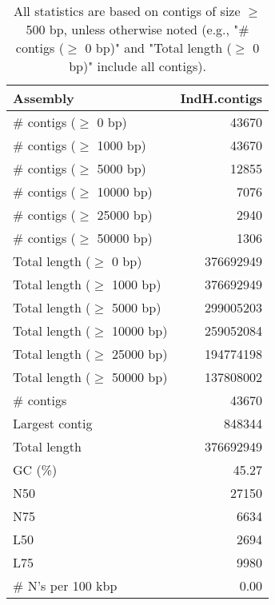 \documentclass[12pt,a4paper]{article}
\begin{document}
\begin{table}[ht]
\begin{center}
\caption{All statistics are based on contigs of size $\geq$ 500 bp, unless otherwise noted (e.g., "\# contigs ($\geq$ 0 bp)" and "Total length ($\geq$ 0 bp)" include all contigs).}
\begin{tabular}{|l*{1}{|r}|}
\hline
Assembly & IndH.contigs \\ \hline
\# contigs ($\geq$ 0 bp) & 43670 \\ \hline
\# contigs ($\geq$ 1000 bp) & 43670 \\ \hline
\# contigs ($\geq$ 5000 bp) & 12855 \\ \hline
\# contigs ($\geq$ 10000 bp) & 7076 \\ \hline
\# contigs ($\geq$ 25000 bp) & 2940 \\ \hline
\# contigs ($\geq$ 50000 bp) & 1306 \\ \hline
Total length ($\geq$ 0 bp) & 376692949 \\ \hline
Total length ($\geq$ 1000 bp) & 376692949 \\ \hline
Total length ($\geq$ 5000 bp) & 299005203 \\ \hline
Total length ($\geq$ 10000 bp) & 259052084 \\ \hline
Total length ($\geq$ 25000 bp) & 194774198 \\ \hline
Total length ($\geq$ 50000 bp) & 137808002 \\ \hline
\# contigs & 43670 \\ \hline
Largest contig & 848344 \\ \hline
Total length & 376692949 \\ \hline
GC (\%) & 45.27 \\ \hline
N50 & 27150 \\ \hline
N75 & 6634 \\ \hline
L50 & 2694 \\ \hline
L75 & 9980 \\ \hline
\# N's per 100 kbp & 0.00 \\ \hline
\end{tabular}
\end{center}
\end{table}
\end{document}
